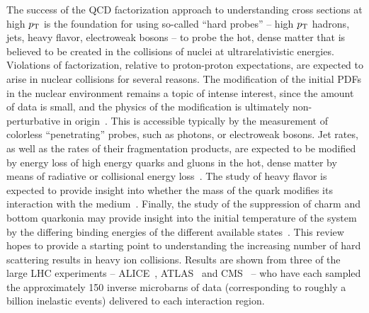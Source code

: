 The success of the QCD factorization approach to understanding cross sections at high $\mbox{$p_{\mathrm{T}}$}$
is the foundation for using so-called ``hard probes'' -- high $\mbox{$p_{\mathrm{T}}$}$ hadrons, jets, heavy flavor, electroweak bosons --
to probe the hot, dense matter that is believed to be created in the collisions of nuclei at 
ultrarelativistic energies.
Violations of factorization, relative to proton-proton expectations, are expected to arise in nuclear collisions
for several reasons. 
The modification of the initial PDFs in the nuclear environment remains a topic of intense interest, since
the amount of data is small, and the physics of the modification is ultimately non-perturbative 
in origin~\cite{Eskola:2009yy}.
This is accessible typically by the measurement of colorless ``penetrating'' probes, such as photons, or electroweak
bosons.
Jet rates, as well as the rates of their fragmentation products, are expected to be modified by energy loss
of high energy quarks and gluons in the hot, dense matter by means of radiative or 
collisional energy loss~\cite{Wang:1991hta}.
The study of heavy flavor is expected to provide insight into whether the mass of the quark modifies its
interaction with the medium~\cite{Dokshitzer:2001zm}.  
Finally, the study of the suppression of charm and bottom quarkonia may provide  
insight into the initial temperature of the system by the differing binding energies of the different
available states~\cite{Matsui:1986dk}.
This review hopes to provide a starting point to understanding the increasing number of hard scattering results in
heavy ion collisions.
Results are shown from three of the large LHC experiments -- ALICE~\cite{Aamodt:2008zz}, ATLAS~\cite{Aad:2008zzm} 
and CMS~\cite{Chatrchyan:2008aa} -- who have each sampled the
approximately 150 inverse microbarns of data (corresponding to roughly a billion inelastic events) 
delivered to each interaction region.
